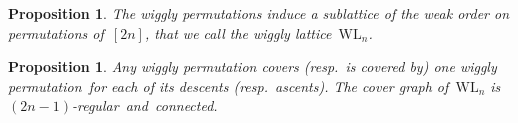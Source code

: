 \documentclass[submission]{FPSAC2025}
\newtheorem{proposition}[theorem]{Proposition}
\theoremstyle{definition}
\newtheorem{remark}[theorem]{Remark}
\newcommand{\ie}{\textit{i.e.}~} %
\newcommand{\darkblue}{\color{darkblue}} %
\newcommand{\defn}[1]{\textsl{\darkblue #1}} %
\newcommand{\wigglyLattice}{\mathrm{WL}} %
\begin{document}
\begin{proposition}
The wiggly permutations induce a sublattice of the weak order on permutations of~$[2n]$, that we call the \defn{wiggly lattice}~$\wigglyLattice_n$.
\end{proposition}

\begin{proposition}
Any wiggly permutation covers (resp.~is covered by) one wiggly permutation~for each of its descents (resp.~ascents).
The cover graph of~$\wigglyLattice_n$ is $(2n-1)$-regular~and~connected.
\end{proposition}

\end{document}
